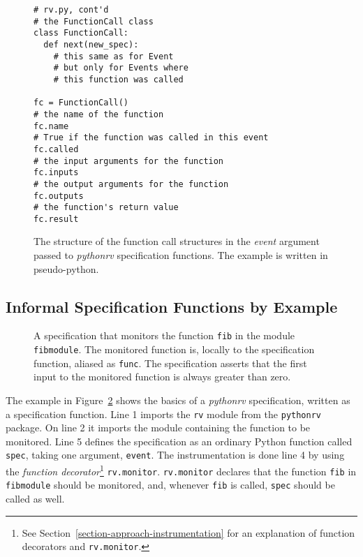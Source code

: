 \documentclass[a4paper,11pt]{kth-mag}
\theoremstyle{definition}
\begin{document}
\begin{figure}[h!]
	\begin{center}
	\begin{minipage}{0.7\textwidth}
	\begin{lstlisting}
# rv.py, cont'd
# the FunctionCall class
class FunctionCall:
  def next(new_spec):
    # this same as for Event
    # but only for Events where
    # this function was called

fc = FunctionCall()
# the name of the function
fc.name
# True if the function was called in this event
fc.called
# the input arguments for the function
fc.inputs
# the output arguments for the function
fc.outputs
# the function's return value
fc.result
	\end{lstlisting}
	\end{minipage}
	\end{center}

  \caption{The structure of the function call structures in the \textit{event}
    argument passed to \textit{pythonrv} specification functions. The example
    is written in pseudo-python.}
	\label{figure-event-function-call}
\end{figure}

\subsection{Informal Specification Functions by Example}
\lstset{language=Python,numbers=left}

\begin{figure}[h!]
	\begin{center}
	\begin{minipage}{0.7\textwidth}
	
	\end{minipage}
	\end{center}

  \caption{A specification that monitors the function \texttt{fib} in the
    module \texttt{fibmodule}. The monitored function is, locally to the
    specification function, aliased as \texttt{func}. The specification asserts
    that the first input to the monitored function is always greater than
    zero.}
	\label{figure-syntax-example-1}
\end{figure}

The example in Figure~\ref{figure-syntax-example-1} shows the basics of a
\textit{pythonrv} specification, written as a specification function. Line 1
imports the \texttt{rv} module from the \texttt{pythonrv} package. On line 2 it
imports the module containing the function to be monitored. Line 5 defines
the specification as an ordinary Python function called \texttt{spec}, taking
one argument, \texttt{event}. The instrumentation is done line 4 by using the
\textit{function decorator}\footnote{See
Section~\ref{section-approach-instrumentation} for an explanation of function
decorators and \texttt{rv.monitor}.} \texttt{rv.monitor}. \texttt{rv.monitor}
declares that the function \texttt{fib} in \texttt{fibmodule} should be
monitored, and, whenever \texttt{fib} is called, \texttt{spec} should be called
as well.
\end{document}
